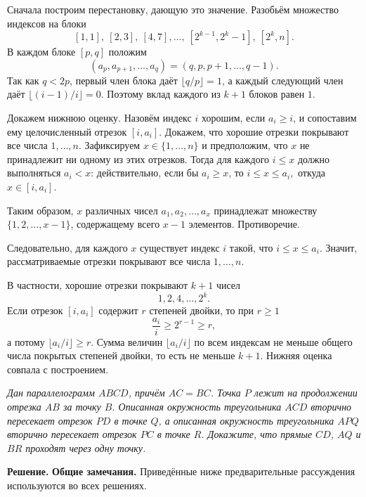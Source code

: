 Сначала построим перестановку, дающую это значение. Разобьём множество индексов на блоки
\[
 [1,1],\ [2,3],\ [4,7],\dots,\ [2^{k-1},2^k-1],\ [2^k,n].
\]
В каждом блоке $[p,q]$ положим
\[
 (a_p,a_{p+1},\dots,a_q)=(q,p,p+1,\dots,q-1).
\]
Так как $q<2p$, первый член блока даёт $\lfloor q/p\rfloor=1$, а каждый следующий член даёт $\lfloor(i-1)/i\rfloor=0$. Поэтому вклад каждого из $k+1$ блоков равен $1$.

Докажем нижнюю оценку. Назовём индекс $i$ хорошим, если $a_i\geq i$, и сопоставим ему целочисленный отрезок $[i,a_i]$.  Докажем, что хорошие отрезки покрывают все числа $1,\dots,n$. Зафиксируем $x\in\{1,\dots,n\}$ и предположим, что $x$ не принадлежит
ни одному из этих отрезков. Тогда для каждого $i\leq x$ должно
выполняться $a_i<x$: действительно, если бы $a_i\geq x$, то $i\leq x\leq a_i,$ откуда $x\in[i,a_i]$.

Таким образом, $x$ различных чисел $a_1,a_2,\dots,a_x$ принадлежат множеству $\{1,2,\dots,x-1\}$, содержащему всего $x-1$ элементов. Противоречие.

Следовательно, для каждого $x$ существует индекс $i$ такой, что $i\leq x\leq a_i.$ Значит, рассматриваемые отрезки покрывают все числа $1,\dots,n$.

В частности, хорошие отрезки покрывают $k+1$ чисел
\[
 1,2,4,\dots,2^k.
\]
Если отрезок $[i,a_i]$ содержит $r$ степеней двойки, то при $r\geq1$
\[
 \frac{a_i}{i}\geq 2^{r-1}\geq r,
\]
а потому $\lfloor a_i/i\rfloor\geq r$. Сумма величин $\lfloor a_i/i\rfloor$ по всем индексам не меньше общего числа покрытых степеней двойки, то есть не меньше $k+1$. Нижняя оценка совпала с построением.


\textit{Дан параллелограмм $ABCD$, причём $AC=BC$. Точка $P$ лежит на продолжении отрезка $AB$ за точку $B$. Описанная окружность треугольника $ACD$ вторично пересекает отрезок $PD$ в точке $Q$, а описанная окружность треугольника $APQ$ вторично пересекает отрезок $PC$ в точке $R$. Докажите, что прямые $CD$, $AQ$ и $BR$ проходят через одну точку.}

\textbf{Решение.}
\noindent\textbf{Общие замечания.}
Приведённые ниже предварительные рассуждения используются во всех решениях.

